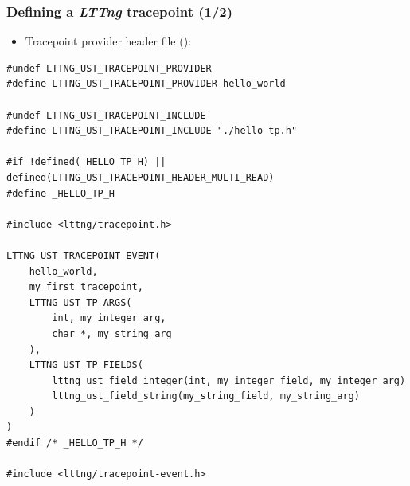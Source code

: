 \begin{frame}[fragile]
  \frametitle{Defining a {\em LTTng} tracepoint (1/2)}

  \begin{itemize}
    \item Tracepoint provider header file ():
  \end{itemize}
  \begin{block}{}
    \begin{verbatim}
#undef LTTNG_UST_TRACEPOINT_PROVIDER
#define LTTNG_UST_TRACEPOINT_PROVIDER hello_world

#undef LTTNG_UST_TRACEPOINT_INCLUDE
#define LTTNG_UST_TRACEPOINT_INCLUDE "./hello-tp.h"

#if !defined(_HELLO_TP_H) || defined(LTTNG_UST_TRACEPOINT_HEADER_MULTI_READ)
#define _HELLO_TP_H

#include <lttng/tracepoint.h>

LTTNG_UST_TRACEPOINT_EVENT(
    hello_world,
    my_first_tracepoint,
    LTTNG_UST_TP_ARGS(
        int, my_integer_arg,
        char *, my_string_arg
    ),
    LTTNG_UST_TP_FIELDS(
        lttng_ust_field_integer(int, my_integer_field, my_integer_arg)
        lttng_ust_field_string(my_string_field, my_string_arg)
    )
)
#endif /* _HELLO_TP_H */

#include <lttng/tracepoint-event.h>
   \end{verbatim}
  \end{block}
\end{frame}


